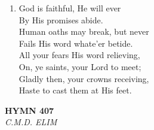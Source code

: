 \begin{enumerate}
    \item God is faithful, He will ever \\
        By His promises abide. \\
        Human oaths may break, but never \\
        Fails His word whate'er betide. \\
        All your fears His word relieving, \\
        On, ye saints, your Lord to meet; \\
        Gladly then, your crowns receiving, \\
        Haste to cast them at His feet.

\end{enumerate}

\newpage
\begin{center}
    {\Large \textbf{HYMN 407}}
    \\
    \textit{C.M.D. ELIM}
\end{center}
\vspace{1em}

